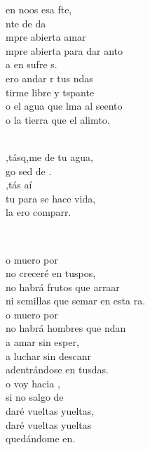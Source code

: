 \documentclass[12pt]{article}
\begin{document}
\begin{multicols*}{2}
\begin{cancion}
	 en noos esa fte,\\
	nte de da\\
	mpre abierta  amar\\
	mpre abierta para dar anto\\
	a en sufre s. \\
	ero andar r tus ndas\\
	tirme libre y tspante\\
	o el agua que lma al seento\\
	o la tierra que el alimto.\\\jump\\
	\begin{chorus}%
	,tásq,me de tu agua, \\
	go sed de .\\
	,tás aí\\
	tu para se hace vida,\\
	la ero comparr.\\
	\end{chorus}%
	\jump\\
\end{cancion}%

\begin{cancion}%
	o muero por  \\
	no creceré en tuspos,\\
	no habrá frutos que arraar\\
	ni semillas que semar en esta ra.\\
	o muero por  \\
	no habrá hombres que ndan\\
	a amar sin esper,\\
	a luchar sin descanr\\
	adentrándose en tusdas.\\
	o voy hacia ,\\
	si no salgo de \\
	daré vueltas yueltas,\\
	daré vueltas yueltas\\
	quedándome en.\\
\end{cancion}%


\end{multicols*}
\end{document}
